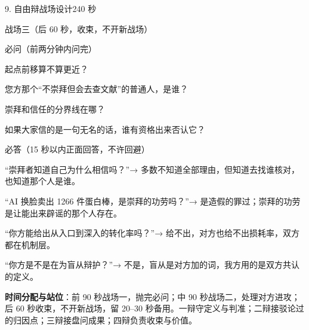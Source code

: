 \documentclass[script,pro]{debate}
\begin{document}
\begin{stage}{9. 自由辩战场设计}{240 秒}
\begin{battleground}{战场三（后 60 秒，收束，不开新战场）}
\begin{points}{必问（前两分钟内问完）}
\item 起点前移算不算更近？
\item 您方那个“不崇拜但会去查文献”的普通人，是谁？
\item 崇拜和信任的分界线在哪？
\item 如果大家信的是一句无名的话，谁有资格出来否认它？
\end{points}
\begin{points}{必答（15 秒以内正面回答，不许回避）}
\item “崇拜者知道自己为什么相信吗？”→ 多数不知道全部理由，但知道去找谁核对，也知道那个人是谁。
\item “AI 换脸卖出 1266 件蛋白棒，是崇拜的功劳吗？”→ 是造假的罪过；崇拜的功劳是让能出来辟谣的那个人存在。
\item “你方能给出从入口到深入的转化率吗？”→ 给不出，对方也给不出损耗率，双方都在机制层。
\item “你方是不是在为盲从辩护？”→ 不是，盲从是对方加的词，我方用的是双方共认的定义。
\end{points}
\textbf{时间分配与站位}：前 90 秒战场一，抛完必问；中 90 秒战场二，处理对方进攻；后 60 秒收束，不开新战场，留 20–30 秒备用。一辩守定义与判准；二辩接驳论过的归因点；三辩接盘问成果；四辩负责收束与价值。

\end{battleground}
\end{stage}
\end{document}
